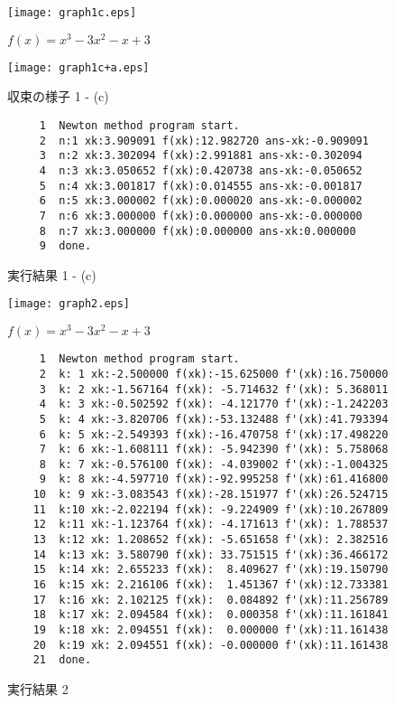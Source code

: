 \documentclass[12pt]{jarticle}
\begin{document}
\begin{figure}[t]
 \begin{minipage}{7.95cm}
  \center
  \texttt{[image: graph1c.eps]}
  \caption{$f(x)=x^3-3x^2-x+3$}
  \label{fig:1c}
 \end{minipage}
 \begin{minipage}{7.95cm}
  \center
  \texttt{[image: graph1c+a.eps]}
  \caption{収束の様子 1 - (c)}
  \label{fig:1c+a}
 \end{minipage}
\begin{screen}
\begin{verbatim}
     1	Newton method program start.
     2	n:1 xk:3.909091 f(xk):12.982720 ans-xk:-0.909091
     3	n:2 xk:3.302094 f(xk):2.991881 ans-xk:-0.302094
     4	n:3 xk:3.050652 f(xk):0.420738 ans-xk:-0.050652
     5	n:4 xk:3.001817 f(xk):0.014555 ans-xk:-0.001817
     6	n:5 xk:3.000002 f(xk):0.000020 ans-xk:-0.000002
     7	n:6 xk:3.000000 f(xk):0.000000 ans-xk:-0.000000
     8	n:7 xk:3.000000 f(xk):0.000000 ans-xk:0.000000
     9	done.
\end{verbatim}
\end{screen}
\caption{実行結果 1 - (c)}
\label{fig:1cc}
\end{figure}

\begin{figure}[t]
  \center
  \texttt{[image: graph2.eps]}
  \caption{$f(x)=x^3-3x^2-x+3$}
  \label{fig:2}
\begin{screen}
\begin{verbatim}
     1	Newton method program start.
     2	k: 1 xk:-2.500000 f(xk):-15.625000 f'(xk):16.750000
     3	k: 2 xk:-1.567164 f(xk): -5.714632 f'(xk): 5.368011
     4	k: 3 xk:-0.502592 f(xk): -4.121770 f'(xk):-1.242203
     5	k: 4 xk:-3.820706 f(xk):-53.132488 f'(xk):41.793394
     6	k: 5 xk:-2.549393 f(xk):-16.470758 f'(xk):17.498220
     7	k: 6 xk:-1.608111 f(xk): -5.942390 f'(xk): 5.758068
     8	k: 7 xk:-0.576100 f(xk): -4.039002 f'(xk):-1.004325
     9	k: 8 xk:-4.597710 f(xk):-92.995258 f'(xk):61.416800
    10	k: 9 xk:-3.083543 f(xk):-28.151977 f'(xk):26.524715
    11	k:10 xk:-2.022194 f(xk): -9.224909 f'(xk):10.267809
    12	k:11 xk:-1.123764 f(xk): -4.171613 f'(xk): 1.788537
    13	k:12 xk: 1.208652 f(xk): -5.651658 f'(xk): 2.382516
    14	k:13 xk: 3.580790 f(xk): 33.751515 f'(xk):36.466172
    15	k:14 xk: 2.655233 f(xk):  8.409627 f'(xk):19.150790
    16	k:15 xk: 2.216106 f(xk):  1.451367 f'(xk):12.733381
    17	k:16 xk: 2.102125 f(xk):  0.084892 f'(xk):11.256789
    18	k:17 xk: 2.094584 f(xk):  0.000358 f'(xk):11.161841
    19	k:18 xk: 2.094551 f(xk):  0.000000 f'(xk):11.161438
    20	k:19 xk: 2.094551 f(xk): -0.000000 f'(xk):11.161438
    21	done.
\end{verbatim}
\end{screen}
\caption{実行結果 2}
\label{fig:22}
\end{figure}
\end{document}

